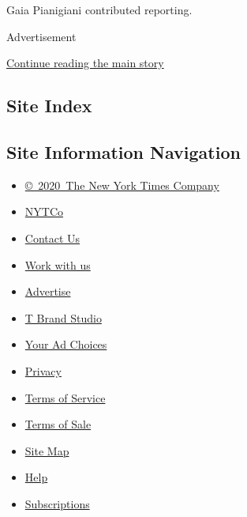Gaia Pianigiani contributed reporting.

Advertisement

\protect\hyperlink{after-bottom}{Continue reading the main story}

\hypertarget{site-index}{%
\subsection{Site Index}\label{site-index}}

\hypertarget{site-information-navigation}{%
\subsection{Site Information
Navigation}\label{site-information-navigation}}

\begin{itemize}
\tightlist
\item
  \href{https://help.nytimes3xbfgragh.onion/hc/en-us/articles/115014792127-Copyright-notice}{©~2020~The
  New York Times Company}
\end{itemize}

\begin{itemize}
\tightlist
\item
  \href{https://www.nytco.com/}{NYTCo}
\item
  \href{https://help.nytimes3xbfgragh.onion/hc/en-us/articles/115015385887-Contact-Us}{Contact
  Us}
\item
  \href{https://www.nytco.com/careers/}{Work with us}
\item
  \href{https://nytmediakit.com/}{Advertise}
\item
  \href{http://www.tbrandstudio.com/}{T Brand Studio}
\item
  \href{https://www.nytimes3xbfgragh.onion/privacy/cookie-policy\#how-do-i-manage-trackers}{Your
  Ad Choices}
\item
  \href{https://www.nytimes3xbfgragh.onion/privacy}{Privacy}
\item
  \href{https://help.nytimes3xbfgragh.onion/hc/en-us/articles/115014893428-Terms-of-service}{Terms
  of Service}
\item
  \href{https://help.nytimes3xbfgragh.onion/hc/en-us/articles/115014893968-Terms-of-sale}{Terms
  of Sale}
\item
  \href{https://spiderbites.nytimes3xbfgragh.onion}{Site Map}
\item
  \href{https://help.nytimes3xbfgragh.onion/hc/en-us}{Help}
\item
  \href{https://www.nytimes3xbfgragh.onion/subscription?campaignId=37WXW}{Subscriptions}
\end{itemize}
